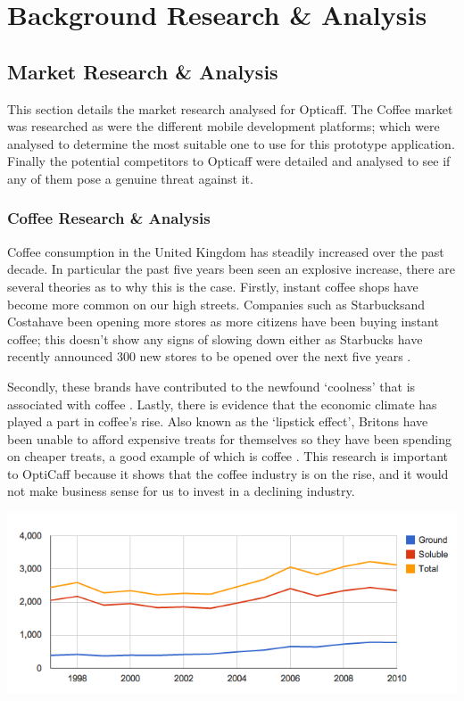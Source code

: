 \section{Background Research \& Analysis}

\subsection{Market Research \& Analysis}
This section details the market research analysed for Opticaff.
The Coffee market was researched as were the different mobile development platforms; which were analysed to determine the most suitable one to use for this prototype application. 
Finally the potential competitors to Opticaff were detailed and analysed to see if any of them pose a genuine threat against it. 

\subsubsection{Coffee Research \& Analysis}
Coffee consumption in the United Kingdom has steadily increased over the past decade. 
In particular the past five years been seen an explosive increase, there are several theories as to why this is the case.
Firstly, instant coffee shops have become more common on our high streets. 
Companies such as Starbucks\texttrademark and Costa\texttrademark have been opening more stores as more citizens have been buying instant coffee; this doesn’t show any signs of slowing down either as Starbucks have recently announced 300 new stores to be opened over the next five years \cite{starbucks}.

Secondly, these brands have contributed to the newfound ‘coolness’ that is associated with coffee \cite{popular}. 
Lastly, there is evidence that the economic climate has played a part in coffee’s rise. 
Also known as the ‘lipstick effect’, Britons have been unable to afford expensive treats for themselves so they have been spending on cheaper treats, a good example of which is coffee \cite{costa}.
This research is important to OptiCaff because it shows that the coffee industry is on the rise, and it would not make business sense for us to invest in a declining industry.

\begin{center}
\includegraphics[trim = 0mm 0mm 0mm 0mm, clip, scale=0.38]{images/CaffeineGraph.png}
\end{center}

